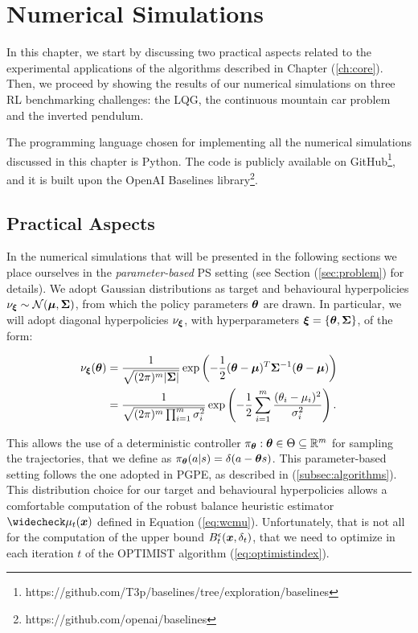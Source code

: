 
\chapter{Numerical Simulations} \label{ch:experiments}
In this chapter, we start by discussing two practical aspects related to the experimental applications of the algorithms described in Chapter (\ref{ch:core}). Then, we proceed by showing the results of our numerical simulations on three \gls{RL} benchmarking challenges: the \gls{LQG}, the continuous mountain car problem and the inverted pendulum.

The programming language chosen for implementing all the numerical simulations discussed in this chapter is Python. The code is publicly available on GitHub\footnote{https://github.com/T3p/baselines/tree/exploration/baselines}, and it is built upon the OpenAI Baselines library\footnote{https://github.com/openai/baselines}.

\section{Practical Aspects} \label{sec:practical}
In the numerical simulations that will be presented in the following sections we place ourselves in the \emph{parameter-based} \gls{PS} setting (see Section (\ref{sec:problem}) for details). We adopt Gaussian distributions as target and behavioural hyperpolicies $\nu_{\boldsymbol{\xi}}\sim \mathcal{N}(\boldsymbol{\mu},\boldsymbol{\Sigma})$, from which the policy parameters $\boldsymbol{\theta}$ are drawn. In particular, we will adopt diagonal hyperpolicies $\nu_{\boldsymbol{\xi}}$, with hyperparameters $\boldsymbol{\xi}=\{\boldsymbol{\theta},\boldsymbol{\Sigma}\}$, of the form: 

\begin{align}
\nu_{\boldsymbol{\xi}}(\boldsymbol{\theta}) & = \frac{1}{\sqrt{(2\pi)^m |\boldsymbol{\Sigma} |}}\exp\left(
	-\frac{1}{2} (\boldsymbol{\theta} - \boldsymbol{\mu} )^T\boldsymbol{\Sigma}^{-1}(\boldsymbol{\theta} - \boldsymbol{\mu} )\right)\\
	& = \frac{1}{\sqrt{(2\pi)^m \prod_{i=1}^{m} \sigma_{i}^2}}\exp\left(
	-\frac{1}{2} \sum\limits_{i=1}^m\frac{(\theta_{i}-\mu_{i})^2}{\sigma_{i}^2}\right).
\end{align}

This allows the use of a deterministic controller $\pi_{\boldsymbol{\theta}}: \boldsymbol{\theta}\in\Theta\subseteq\mathbb{R}^m$ for sampling the trajectories, that we define as $\pi_{\boldsymbol{\theta}}(a|s)=\delta(a-\boldsymbol{\theta} s)$. This parameter-based setting follows the one adopted in \gls{PGPE}, as described in (\ref{subsec:algorithms}). \\
This distribution choice for our target and behavioural hyperpolicies allows a comfortable computation of the robust balance heuristic estimator $\wc{\mu}_t(\vx)$ defined in Equation (\ref{eq:wcmu}). Unfortunately, that is not all for the computation of the upper bound $B_t^{\epsilon}(\boldsymbol{x},\delta_t)$, that we need to optimize in each iteration $t$ of the \gls{OPTIMIST} algorithm (\ref{eq:optimistindex}).

